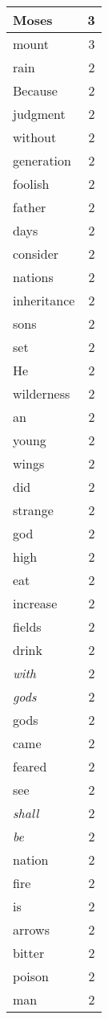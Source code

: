 \begin{center}
\begin{longtable}{l|r}
Moses & 3 \\ \hline
mount & 3 \\ \hline
rain & 2 \\ \hline
Because & 2 \\ \hline
judgment & 2 \\ \hline
without & 2 \\ \hline
generation & 2 \\ \hline
foolish & 2 \\ \hline
father & 2 \\ \hline
days & 2 \\ \hline
consider & 2 \\ \hline
nations & 2 \\ \hline
inheritance & 2 \\ \hline
sons & 2 \\ \hline
set & 2 \\ \hline
He & 2 \\ \hline
wilderness & 2 \\ \hline
an & 2 \\ \hline
young & 2 \\ \hline
wings & 2 \\ \hline
did & 2 \\ \hline
strange & 2 \\ \hline
god & 2 \\ \hline
high & 2 \\ \hline
eat & 2 \\ \hline
increase & 2 \\ \hline
fields & 2 \\ \hline
drink & 2 \\ \hline
\emph{with} & 2 \\ \hline
\emph{gods} & 2 \\ \hline
gods & 2 \\ \hline
came & 2 \\ \hline
feared & 2 \\ \hline
see & 2 \\ \hline
\emph{shall} & 2 \\ \hline
\emph{be} & 2 \\ \hline
nation & 2 \\ \hline
fire & 2 \\ \hline
is & 2 \\ \hline
arrows & 2 \\ \hline
bitter & 2 \\ \hline
poison & 2 \\ \hline
man & 2 \\ \hline

\end{longtable}
\end{center}
